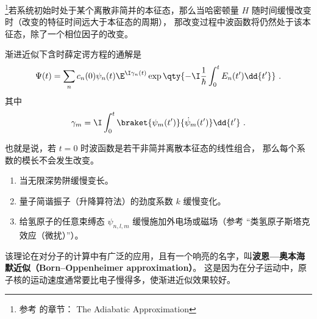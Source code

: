 
\begin{issues}
\issueTODO
\end{issues}

\footnote{参考 \cite{GriffE} 的章节： The Adiabatic Approximation}若系统初始时处于某个离散非简并的本征态，那么当哈密顿量 $H$ 随时间缓慢改变时（改变的特征时间远大于本征态的周期）， 那改变过程中波函数将仍然处于该本征态，除了一个相位因子的改变。

渐进近似下含时薛定谔方程的通解是
\begin{equation}\label{eq_AdiaQM_2}
\Psi(t) = \sum_n c_n(0) \psi_n(t) \E^{\I\gamma_n(t)}\exp\qty{-\I\frac{1}{\hbar} \int_0^t E_n(t')\dd{t'}}~.
\end{equation}
其中
\begin{equation}
\gamma_m = \I \int_0^t \braket{\psi_m(t')}{\dot\psi_m(t')}\dd{t'}~.
\end{equation}

也就是说，若 $t=0$ 时波函数是若干非简并离散本征态的线性组合， 那么每个系数的模长不会发生改变。

\begin{example}{}
\begin{enumerate}
\item 当无限深势阱缓慢变长。
\item 量子简谐振子（升降算符法）的劲度系数 $k$ 缓慢变化。
\item 给氢原子的任意束缚态 $\psi_{n,l,m}$ 缓慢施加外电场或磁场（参考 “类氢原子斯塔克效应（微扰）”）。
\end{enumerate}
\end{example}

该理论在对分子的计算中有广泛的应用，且有一个响亮的名字，叫\textbf{波恩—奥本海默近似（Born–Oppenheimer approximation）}。 这是因为在分子运动中，原子核的运动速度通常要比电子慢得多，使渐进近似效果较好。

